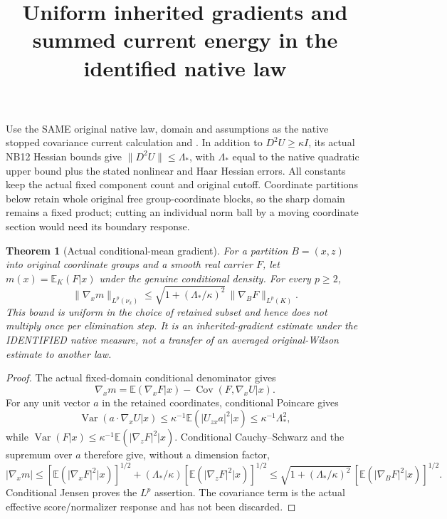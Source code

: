 \documentclass[11pt]{article}
\title{Uniform inherited gradients and summed current energy in the identified native law}\author{}\date{}
\newtheorem{theorem}{Theorem}
\newcommand{\E}{\mathbb E}
\newcommand{\Var}{\operatorname{Var}}
\newcommand{\Cov}{\operatorname{Cov}}
\begin{document}
\maketitle
Use the SAME original native law, domain and assumptions as the native stopped covariance current calculation and \cite[Section~3]{ND}. In addition to $D^2U\ge\kappa I$, its actual NB12 Hessian bounds give
$\|D^2U\|\le\Lambda_*$, with $\Lambda_*$ equal to the native quadratic upper bound
plus the stated nonlinear and Haar Hessian errors. All constants keep the actual fixed
component count and original cutoff. Coordinate partitions below retain whole original
free group-coordinate blocks, so the sharp domain remains a fixed product; cutting an
individual norm ball by a moving coordinate section would need its boundary response.

\begin{theorem}[Actual conditional-mean gradient]
For a partition $B=(x,z)$ into original coordinate groups and a smooth real carrier $F$,
let $m(x)=\E_K(F|x)$ under the genuine conditional density.
For every $p\ge2$,
\[
 \|\nabla_xm\|_{L^p(\nu_x)}
 \le\sqrt{1+(\Lambda_*/\kappa)^2}\,
          \|\nabla_BF\|_{L^p(K)}.
\]
This bound is uniform in the choice of retained subset and hence does not multiply once
per elimination step. It is an inherited-gradient estimate under the IDENTIFIED native
measure, not a transfer of an averaged original-Wilson estimate to another law.
\end{theorem}
\begin{proof}
The actual fixed-domain conditional denominator gives
\[
 \nabla_xm=\E(\nabla_xF|x)-\Cov(F,\nabla_xU|x).
\]
For any unit vector $a$ in the retained coordinates, conditional Poincare gives
\[
 \Var(a\cdot\nabla_xU|x)\le\kappa^{-1}
     \E(|U_{zx}a|^2|x)\le\kappa^{-1}\Lambda_*^2,
\]
while $\Var(F|x)\le\kappa^{-1}\E(|\nabla_zF|^2|x)$.
Conditional Cauchy--Schwarz and the supremum over $a$ therefore give, without a dimension
factor,
\[
 |\nabla_xm|\le[\E(|\nabla_xF|^2|x)]^{1/2}
       +(\Lambda_*/\kappa)[\E(|\nabla_zF|^2|x)]^{1/2}
 \le\sqrt{1+(\Lambda_*/\kappa)^2}\,[\E(|\nabla_BF|^2|x)]^{1/2}.
\]
Conditional Jensen proves the $L^p$ assertion. The covariance term is the actual effective
score/normalizer response and has not been discarded.
\end{proof}
\end{document}
